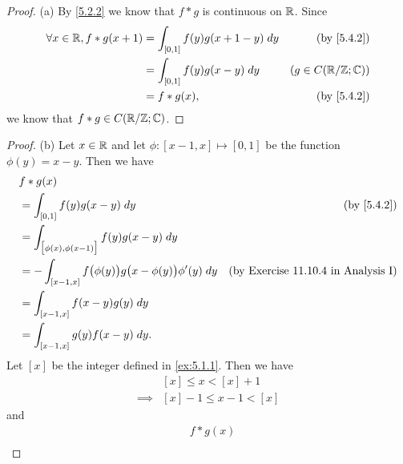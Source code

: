 \begin{proof}{(a)}
  By \cref{5.2.2} we know that \(f * g\) is continuous on \(\mathbb{R}\).
  Since
  \begin{align*}
    \forall x \in \R, f * g(x + 1) & = \int_{[0, 1]} f(y) g(x + 1 - y) \; dy & \text{(by \cref{5.4.2})} \\
                                   & = \int_{[0, 1]} f(y) g(x - y) \; dy     & (g \in C(\R / \Z ; \C))  \\
                                   & = f * g(x),                             & \text{(by \cref{5.4.2})}
  \end{align*}
  we know that \(f * g \in C(\mathbb{R} / \mathbb{Z} ; \mathbb{C})\).
\end{proof}

\begin{proof}{(b)}
  Let \(x \in \mathbb{R}\) and let \(\phi : [x - 1, x] \mapsto [0, 1]\) be the function \(\phi(y) = x - y\).
  Then we have
  \begin{align*}
     & f * g(x)                                                                                                                   \\
     & = \int_{[0, 1]} f(y) g(x - y) \; dy                                           & \text{(by \cref{5.4.2})}                   \\
     & = \int_{\big[\phi(x), \phi(x - 1)\big]} f(y) g(x - y) \; dy                                                                \\
     & = -\int_{[x - 1, x]} f\big(\phi(y)\big) g\big(x - \phi(y)\big) \phi'(y) \; dy & \text{(by Exercise 11.10.4 in Analysis I)} \\
     & = \int_{[x - 1, x]} f(x - y) g(y) \; dy                                                                                    \\
     & = \int_{[x - 1, x]} g(y) f(x - y) \; dy.                                                                                   \\
  \end{align*}
  Let \([x]\) be the integer defined in \cref{ex:5.1.1}.
  Then we have
  \begin{align*}
             & [x] \leq x < [x] + 1     \\
    \implies & [x] - 1 \leq x - 1 < [x]
  \end{align*}
  and
  \begin{align*}
     & f * g(x)                                                                                                                     \\

\end{align*}
\end{proof}
